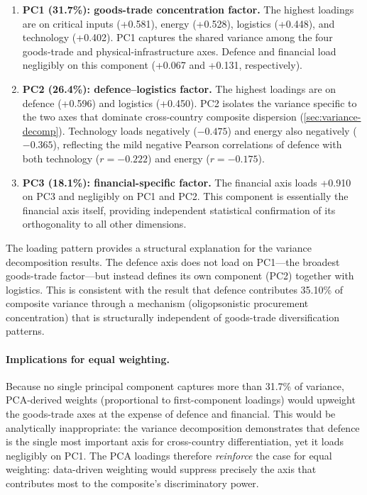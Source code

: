 \begin{enumerate}[leftmargin=2em]
  \item \textbf{PC1 (31.7\%): goods-trade concentration factor.}
    The highest loadings are on critical inputs (+0.581), energy
    (+0.528), logistics (+0.448), and technology (+0.402).  PC1
    captures the shared variance among the four goods-trade and
    physical-infrastructure axes.  Defence and financial load
    negligibly on this component (+0.067 and +0.131, respectively).

  \item \textbf{PC2 (26.4\%): defence--logistics factor.}
    The highest loadings are on defence (+0.596) and logistics
    (+0.450).  PC2 isolates the variance specific to the two axes
    that dominate cross-country composite dispersion
    (\cref{sec:variance-decomp}).  Technology loads negatively
    ($-0.475$) and energy also negatively ($-0.365$), reflecting
    the mild negative Pearson correlations of defence with both
    technology ($r = -0.222$) and energy ($r = -0.175$).

  \item \textbf{PC3 (18.1\%): financial-specific factor.}
    The financial axis loads +0.910 on PC3 and negligibly on PC1
    and PC2.  This component is essentially the financial axis
    itself, providing independent statistical confirmation of its
    orthogonality to all other dimensions.
\end{enumerate}

The loading pattern provides a structural explanation for the
variance decomposition results.  The defence axis does not load
on PC1---the broadest goods-trade factor---but instead defines
its own component (PC2) together with logistics.  This is
consistent with the result that defence contributes 35.10\% of
composite variance through a mechanism (oligopsonistic procurement
concentration) that is structurally independent of goods-trade
diversification patterns.

\paragraph{Implications for equal weighting.}
Because no single principal component captures more than 31.7\% of
variance, PCA-derived weights (proportional to first-component
loadings) would upweight the goods-trade axes at the expense of
defence and financial.  This would be analytically inappropriate:
the variance decomposition demonstrates that defence is the single
most important axis for cross-country differentiation, yet it loads
negligibly on PC1.  The PCA loadings therefore \emph{reinforce}
the case for equal weighting: data-driven weighting would suppress
precisely the axis that contributes most to the composite's
discriminatory power.

